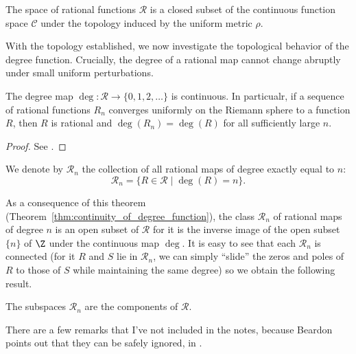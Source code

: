 \begin{corollary}
    The space of rational functions $\mathcal{R}$ is a closed subset of the
    continuous function space $\mathcal{C}$ under the topology induced by the
    uniform metric $\rho$.
\end{corollary}

With the topology established, we now investigate the topological behavior of
the degree function. Crucially, the degree of a rational map cannot change
abruptly under small uniform perturbations.

\begin{theorem}
    \label{thm:continuity_of_degree_function}
    The degree map $\deg : \mathcal{R} \longrightarrow \{0, 1, 2, \dots\}$ is
    continuous. In particualr, if a sequence of rational functions $R_n$
    converges uniformly on the Riemann sphere to a function $R$, then $R$ is
    rational and $\deg(R_n) = \deg(R)$ for all sufficiently large $n$.
\end{theorem}
\begin{proof}
    See \cite[46]{Beardon1991}.
\end{proof}

\begin{definition}
    We denote by $\mathcal{R}_n$ the collection of all rational maps of degree
    exactly equal to $n$:
    \[
        \mathcal{R}_n = \{ R \in \mathcal{R} \mid \deg(R) = n \}.
    \]
\end{definition}

As a consequence of this theorem
(Theorem~\ref{thm:continuity_of_degree_function}), the class $\mathcal{R}_n$ of
rational maps of degree $n$ is an open subset of $\mathcal{R}$ for it is the
inverse image of the open subset $\{n\}$ of $\Z$ under the continuous map $\deg$.
It is easy to see that each $\mathcal{R}_n$ is connected (for it $R$ and $S$ lie
in $\mathcal{R}_n$, we can simply \enquote{slide} the zeros and poles of $R$ to those of $S$ while maintaining the same degree) so we obtain the following result.

\begin{corollary}
    The subspaces $\mathcal{R}_n$ are the components of $\mathcal{R}$.
\end{corollary}

There are a few remarks that I've not included in the notes, because Beardon
points out that they can be safely ignored, in \cite[47]{Beardon1991}.